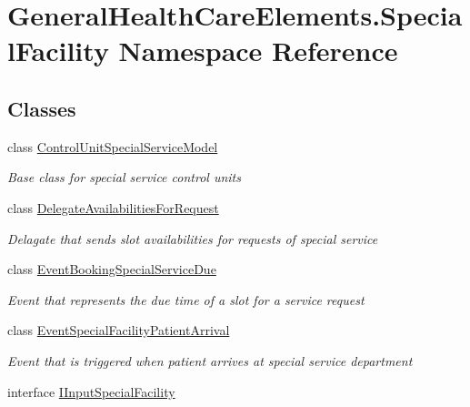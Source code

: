 \hypertarget{namespace_general_health_care_elements_1_1_special_facility}{}\section{General\+Health\+Care\+Elements.\+Special\+Facility Namespace Reference}
\label{namespace_general_health_care_elements_1_1_special_facility}
\subsection*{Classes}
\begin{DoxyCompactItemize}
\item 
class \hyperlink{class_general_health_care_elements_1_1_special_facility_1_1_control_unit_special_service_model}{Control\+Unit\+Special\+Service\+Model}
\begin{DoxyCompactList}\small\item\em Base class for special service control units \end{DoxyCompactList}\item 
class \hyperlink{class_general_health_care_elements_1_1_special_facility_1_1_delegate_availabilities_for_request}{Delegate\+Availabilities\+For\+Request}
\begin{DoxyCompactList}\small\item\em Delagate that sends slot availabilities for requests of special service \end{DoxyCompactList}\item 
class \hyperlink{class_general_health_care_elements_1_1_special_facility_1_1_event_booking_special_service_due}{Event\+Booking\+Special\+Service\+Due}
\begin{DoxyCompactList}\small\item\em Event that represents the due time of a slot for a service request \end{DoxyCompactList}\item 
class \hyperlink{class_general_health_care_elements_1_1_special_facility_1_1_event_special_facility_patient_arrival}{Event\+Special\+Facility\+Patient\+Arrival}
\begin{DoxyCompactList}\small\item\em Event that is triggered when patient arrives at special service department \end{DoxyCompactList}\item 
interface \hyperlink{interface_general_health_care_elements_1_1_special_facility_1_1_i_input_special_facility}{I\+Input\+Special\+Facility}

\end{DoxyCompactItemize}
